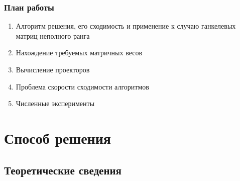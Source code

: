 \documentclass[unicode, notheorems]{beamer}
\newtheorem{solution}{Решение}
\begin{document}
\begin{frame}
	\frametitle{План работы}
	\begin{enumerate}
		\item Алгоритм решения, его сходимость и применение к случаю ганкелевых матриц неполного ранга
		\item Нахождение требуемых матричных весов
		\item Вычисление проекторов
		\item Проблема скорости сходимости алгоритмов
		\item Численные эксперименты
		
	\end{enumerate}
\end{frame}

\section{Способ решения}
\subsection{Теоретические сведения}
%	
%		
\end{document}
